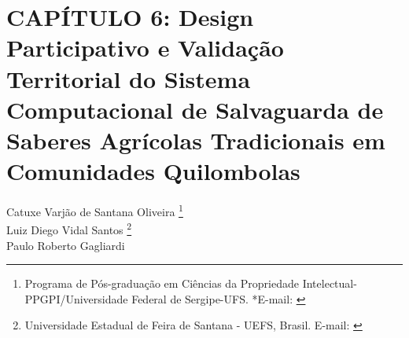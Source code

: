 ﻿\pagestyle{plain}

\chapter{CAPÍTULO 6: Design Participativo e Validação Territorial do Sistema Computacional de Salvaguarda de Saberes Agrícolas Tradicionais em Comunidades Quilombolas}


\begin{flushright}
Catuxe Varjão de Santana Oliveira  \footnote[1]{Programa de Pós-graduação em Ciências da Propriedade Intelectual-PPGPI/Universidade Federal de Sergipe-UFS. *E-mail:  \href{mailto:catuxe@academico.ufs.br}{}}
\\[0.3cm]
Luiz Diego Vidal Santos \footnote[2]{Universidade Estadual de Feira de Santana - UEFS, Brasil. E-mail: \href{mailto:ldvsantos@uefs.br}{}}
\\[0.3cm]
Paulo Roberto Gagliardi \footnotemark[1]
\end{flushright}


